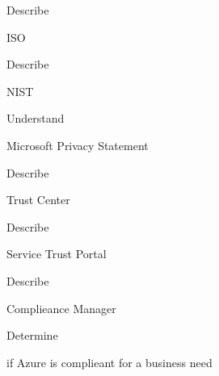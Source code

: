 \documentclass{scrartcl}
\newenvironment{flashcard}[2][]{%
    #1
    \vfill
    \centerline{\Large{#2}}
    \vfill
\newpage
}
{\newpage}
\begin{document}
    \begin{flashcard}[Describe]{ISO}

    \end{flashcard}

    \begin{flashcard}[Describe]{NIST}

    \end{flashcard}

    \begin{flashcard}[Understand]{Microsoft Privacy Statement}

    \end{flashcard}

    \begin{flashcard}[Describe]{Trust Center}

    \end{flashcard}

    \begin{flashcard}[Describe]{Service Trust Portal}

    \end{flashcard}

    \begin{flashcard}[Describe]{Complieance Manager}

    \end{flashcard}

    \begin{flashcard}[Determine]{if Azure is complieant for a business need}

    \end{flashcard}
\end{document}

